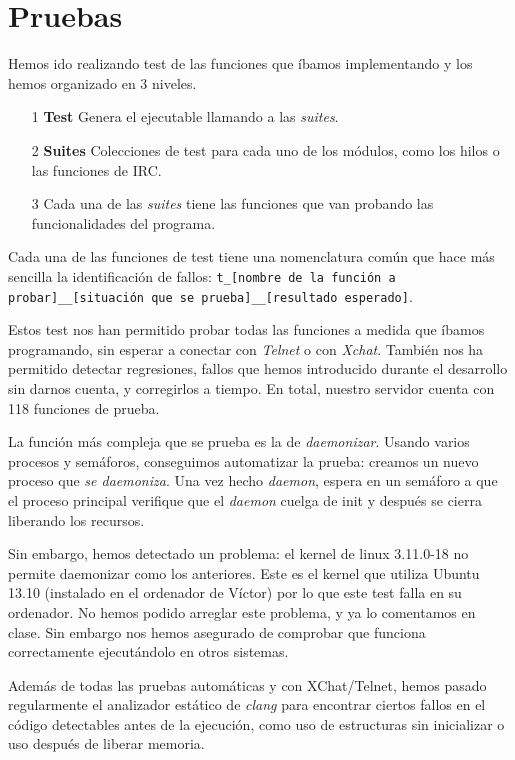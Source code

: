 \documentclass{article}
\begin{document}
\section{Pruebas}
Hemos ido realizando test de las funciones que íbamos implementando y los hemos organizado en 3 niveles. 

\begin{itemize}
\item[1] \textbf{Test} Genera el ejecutable llamando a las \textit{suites}.
\item[2] \textbf{Suites} Colecciones de test para cada uno de los módulos, como los hilos o las funciones de IRC.
\item[3] Cada una de las \textit{suites} tiene las funciones que van probando las funcionalidades del programa.
\end{itemize}

Cada una de las funciones de test tiene una nomenclatura común que hace más sencilla la identificación de fallos: \texttt{t\_[nombre de la función a probar]\_\_[situación que se prueba]\_\_[resultado esperado]}.

Estos test nos han permitido probar todas las funciones a medida que íbamos programando, sin esperar a conectar con \textit{Telnet} o con \textit{Xchat}. También nos ha permitido detectar regresiones, fallos que hemos introducido durante el desarrollo sin darnos cuenta, y corregirlos a tiempo. En total, nuestro servidor cuenta con 118 funciones de prueba.

La función más compleja que se prueba es la de \textit{daemonizar}. Usando varios procesos y semáforos, conseguimos automatizar la prueba: creamos un nuevo proceso que \textit{se daemoniza}. Una vez hecho \textit{daemon}, espera en un semáforo a que el proceso principal verifique que el \textit{daemon} cuelga de init y después se cierra liberando los recursos.

Sin embargo, hemos detectado un problema: el kernel de linux 3.11.0-18 no permite daemonizar como los anteriores. Este es el kernel que utiliza Ubuntu 13.10 (instalado en el ordenador de Víctor) por lo que este test falla en su ordenador. No hemos podido arreglar este problema, y ya lo comentamos en clase. Sin embargo nos hemos asegurado de comprobar que funciona correctamente ejecutándolo en otros sistemas.

Además de todas las pruebas automáticas y con XChat/Telnet, hemos pasado regularmente el analizador estático de \textit{clang} para encontrar ciertos fallos en el código detectables antes de la ejecución, como uso de estructuras sin inicializar o uso después de liberar memoria.
\end{document}
